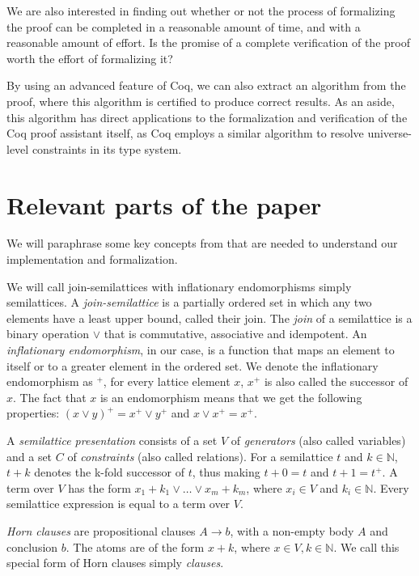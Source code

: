 We are also interested in finding out whether or not the process of formalizing the proof
can be completed in a reasonable amount of time, and with a reasonable amount of effort.
Is the promise of a complete verification of the proof worth the effort of formalizing it?

By using an advanced feature of Coq, we can also extract an algorithm from the proof,
where this algorithm is certified to produce correct results.
As an aside, this algorithm has direct applications to the formalization and verification of the Coq proof assistant itself,
as Coq employs a similar algorithm to resolve universe-level constraints in its type system.

\section{Relevant parts of the paper}
\label{sec:relevant_parts_of_the_paper}

We will paraphrase some key concepts from \cite{mbezem} that are needed to understand
our implementation and formalization.

We will call join-semilattices with inflationary endomorphisms simply semilattices.
A \textit{join-semilattice} is a partially ordered set in which any two elements have a least upper bound,
called their join.
The \textit{join} of a semilattice is a binary operation $\lor$ that is commutative, associative and idempotent.
An \textit{inflationary endomorphism}, in our case, is a function
that maps an element to itself or to a greater element in the ordered set.
We denote the inflationary endomorphism as $^+$, for every lattice element $x$,
$x^+$ is also called the successor of $x$.
The fact that $x$ is an endomorphism means that we get the following properties:
$(x \lor y)^+ = x^+ \lor y^+$ and $x \lor x^+ = x^+$.


A \textit{semilattice presentation} consists of a set $V$ of \textit{generators}
(also called variables) and a set $C$ of \textit{constraints}
(also called relations).
For a semilattice $t$ and $k \in \mathbb{N}$, $t + k$ denotes the k-fold successor of $t$, thus making $t + 0 = t$ and $t + 1 = t^+$.
A term over $V$ has the form $x_1 + k_1 \lor \ldots \lor x_m + k_m$, where $x_i \in V$ and $k_i \in \mathbb{N}$.
Every semilattice expression is equal to a term over $V$.

\textit{Horn clauses} are propositional clauses $A \rightarrow b$, with a non-empty body $A$ and conclusion $b$.
The atoms are of the form $x + k$, where $x \in V, k \in \mathbb{N}$.
We call this special form of Horn clauses simply \textit{clauses}.


